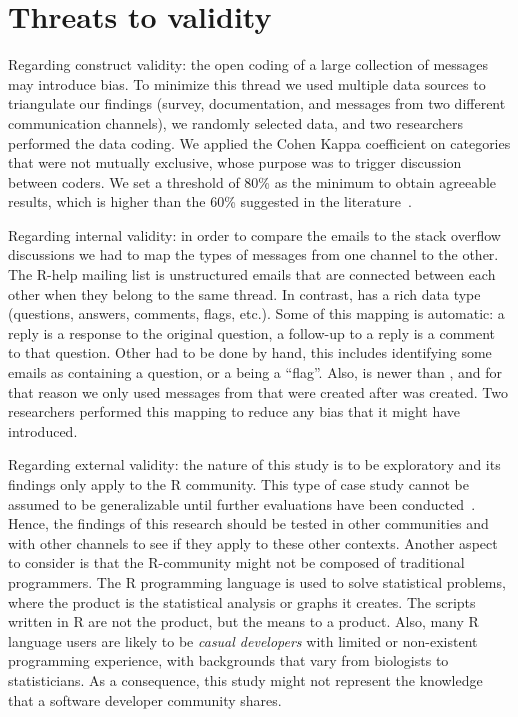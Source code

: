 \section{Threats to validity}
\label{cha:threats}


Regarding construct validity: the open coding of a large collection of messages may introduce bias.  To minimize this thread we used multiple data sources to
triangulate our findings (survey, documentation, and messages from two different communication channels), we randomly selected data, and two researchers
performed the data coding. We applied the Cohen Kappa coefficient on categories that were not mutually exclusive, whose purpose was to trigger discussion
between coders.  We set a threshold of 80\% as the minimum to obtain agreeable results, which is higher than the 60\% suggested in the
literature~\cite{Landis1977}. 

Regarding internal validity: in order to compare the emails to the stack overflow discussions we had to map the types of messages from one channel to the
other. The R-help mailing list is unstructured emails that are connected between each other when they belong to the same thread. In contrast, \SO has a rich
data type (questions, answers, comments, flags, etc.). Some of this mapping is automatic: a reply is a response to the original question, a follow-up to a reply
is a comment to that question. Other had to be done by hand, this includes identifying some emails as containing a question, or a being a ``flag''.
Also, \SO is newer than \RH, and for that reason we only used messages from \RH that were created after \SO was created.
Two researchers performed this mapping to reduce any bias that it might have  introduced.


Regarding external validity: the nature of this study is to be exploratory and its findings only apply to the R community.
This type of case study cannot be assumed to be generalizable until further evaluations have been conducted~\cite{Yin2009}.
    Hence, the findings of this research should be tested in other communities and with other channels to see if they apply to these other contexts.
Another aspect to consider is that the R-community might not be composed of traditional programmers.
    The R programming language is used to solve statistical problems, where the product is the statistical analysis or graphs it creates. The scripts written in
    R are not the product, but the means to a product.
    Also, many R language users are likely to be \textit{casual developers} with limited or non-existent programming experience, with backgrounds that vary from
    biologists to statisticians. As a consequence, this study might not represent the knowledge that a software developer community shares. 

